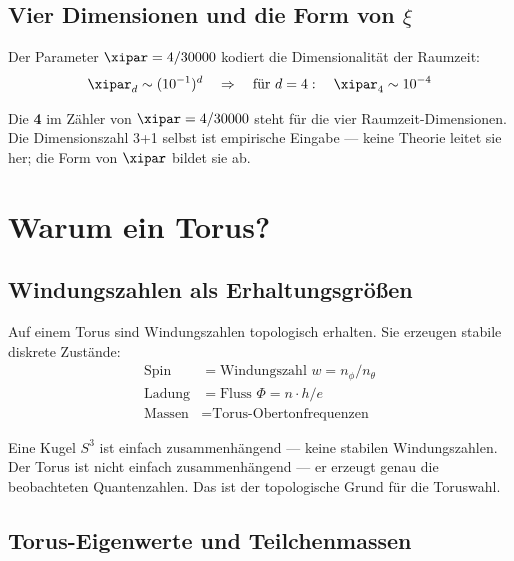 \subsection{Vier Dimensionen und die Form von \texorpdfstring{$\xi$}{xi}}

Der Parameter $\xipar = 4/30000$ kodiert die Dimensionalität der Raumzeit:
\begin{equation}
	\xipar_d \sim (10^{-1})^d \quad \Rightarrow \quad \text{für } d=4: \quad \xipar_4 \sim 10^{-4}
\end{equation}

\begin{keyresult}
Die \textbf{4} im Zähler von $\xipar = 4/30000$ steht für die vier Raumzeit-Dimensionen. Die Dimensionszahl 3+1 selbst ist empirische Eingabe — keine Theorie leitet sie her; die Form von $\xipar$ bildet sie ab.
\end{keyresult}

\section{Warum ein Torus?}

\subsection{Windungszahlen als Erhaltungsgrößen}

Auf einem Torus sind Windungszahlen topologisch erhalten. Sie erzeugen stabile diskrete Zustände:
\begin{align}
	\text{Spin} &= \text{Windungszahl } w = n_\phi / n_\theta \\
	\text{Ladung} &= \text{Fluss } \Phi = n \cdot h/e \\
	\text{Massen} &= \text{Torus-Obertonfrequenzen}
\end{align}

\begin{keypoint}
Eine Kugel $S^3$ ist einfach zusammenhängend — keine stabilen Windungszahlen. Der Torus ist nicht einfach zusammenhängend — er erzeugt genau die beobachteten Quantenzahlen. Das ist der topologische Grund für die Toruswahl.
\end{keypoint}

\subsection{Torus-Eigenwerte und Teilchenmassen}

